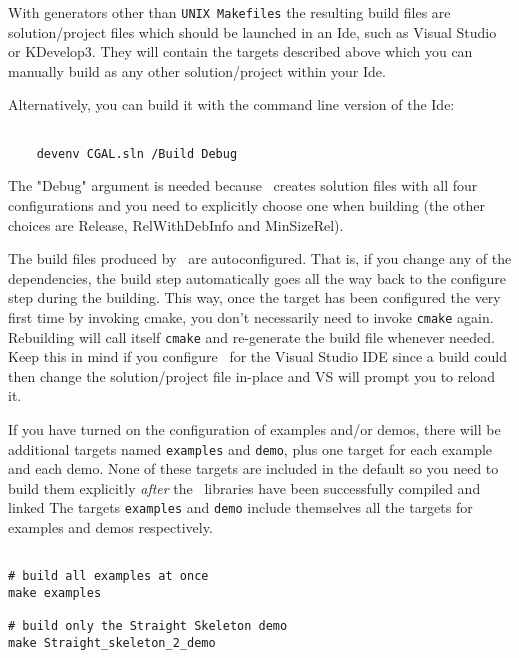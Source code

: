 With generators other than {\tt UNIX Makefiles} the resulting build files are solution/project files which
should be launched in an {\sc Ide}, such as Visual Studio or KDevelop3. They will contain the targets described
above which you can manually build as any other solution/project within your {\sc Ide}.

Alternatively, you can build it with the command line version of the {\sc Ide}:

{\ccTexHtml{\scriptsize}{}
\begin{verbatim}

    devenv CGAL.sln /Build Debug

\end{verbatim}
}

The "Debug" argument is needed because \cmake\ creates solution files with
all four configurations and you need to explicitly choose one when building
(the other choices are Release, RelWithDebInfo and MinSizeRel).


\begin{ccAdvanced}
The build files produced by \cmake\ are autoconfigured. That is, if you change any 
of the dependencies, the build step automatically goes all the way back to the configure step
during the building. This way, once the target has been configured the very first time by
invoking cmake, you don't necessarily need to invoke \texttt{cmake} again. Rebuilding will call
itself \texttt{cmake} and re-generate the build file whenever needed. Keep this in mind if you
configure \cgal\ for the Visual Studio IDE since a build could then change the solution/project 
file in-place and VS will prompt you to reload it.
\end{ccAdvanced}


If you have turned on the configuration of examples and/or demos, there will be additional
targets named \texttt{examples} and \texttt{demo}, plus one target for each example and each demo.
None of these targets are included in the default so you need to build them explicitly
{\em after} the \cgal\ libraries have been successfully compiled and linked
The targets \texttt{examples} and \texttt{demo} include themselves all the targets
for examples and demos respectively.

{\ccTexHtml{\scriptsize}{}
\begin{verbatim}

# build all examples at once
make examples 

# build only the Straight Skeleton demo
make Straight_skeleton_2_demo

\end{verbatim}
}

